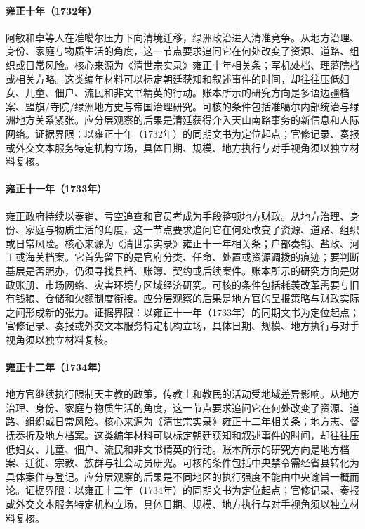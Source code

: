 \hypertarget{social:EQ-1732-AMIN-KHOJA-FLIGHT}{}\paragraph{雍正十年（1732年）}阿敏和卓等人在准噶尔压力下向清境迁移，绿洲政治进入清准竞争。从地方治理、身份、家庭与物质生活的角度，这一节点要求追问它在何处改变了资源、道路、组织或日常风险。核心来源为《清世宗实录》雍正十年相关条；军机处档、理藩院档或相关方略。这类编年材料可以标定朝廷获知和叙述事件的时间，却往往压低妇女、儿童、佃户、流民和非文书精英的行动。账本所示的研究方向是多语边疆档案、盟旗/寺院/绿洲地方史与帝国治理研究。可核的条件包括准噶尔内部统治与绿洲地方关系紧张。应分层观察的后果是清廷获得介入天山南路事务的新信息和人际网络。证据界限：以雍正十年（1732年）的同期文书为定位起点；官修记录、奏报或外交文本服务特定机构立场，具体日期、规模、地方执行与对手视角须以独立材料复核。
\hypertarget{social:EQ-1733-YONGZHENG-FISCAL-INSPECTION}{}\paragraph{雍正十一年（1733年）}雍正政府持续以奏销、亏空追查和官员考成为手段整顿地方财政。从地方治理、身份、家庭与物质生活的角度，这一节点要求追问它在何处改变了资源、道路、组织或日常风险。核心来源为《清世宗实录》雍正十一年相关条；户部奏销、盐政、河工或海关档案。它首先留下的是官府分类、任命、处置或资源调拨的痕迹；要判断基层是否照办，仍须寻找县档、账簿、契约或后续案件。账本所示的研究方向是财政账册、市场网络、灾害环境与区域经济研究。可核的条件包括耗羡改革需要与旧有钱粮、仓储和欠额制度衔接。应分层观察的后果是地方官的呈报策略与财政实际之间形成新的张力。证据界限：以雍正十一年（1733年）的同期文书为定位起点；官修记录、奏报或外交文本服务特定机构立场，具体日期、规模、地方执行与对手视角须以独立材料复核。
\hypertarget{social:EQ-1734-CHRISTIAN-ENFORCEMENT}{}\paragraph{雍正十二年（1734年）}地方官继续执行限制天主教的政策，传教士和教民的活动受地域差异影响。从地方治理、身份、家庭与物质生活的角度，这一节点要求追问它在何处改变了资源、道路、组织或日常风险。核心来源为《清世宗实录》雍正十二年相关条；地方志、督抚奏折及地方档案。这类编年材料可以标定朝廷获知和叙述事件的时间，却往往压低妇女、儿童、佃户、流民和非文书精英的行动。账本所示的研究方向是地方档案、迁徙、宗教、族群与社会动员研究。可核的条件包括中央禁令需经省县转化为具体案件与登记。应分层观察的后果是不同地区的执行强度不能由中央谕旨一概而论。证据界限：以雍正十二年（1734年）的同期文书为定位起点；官修记录、奏报或外交文本服务特定机构立场，具体日期、规模、地方执行与对手视角须以独立材料复核。
